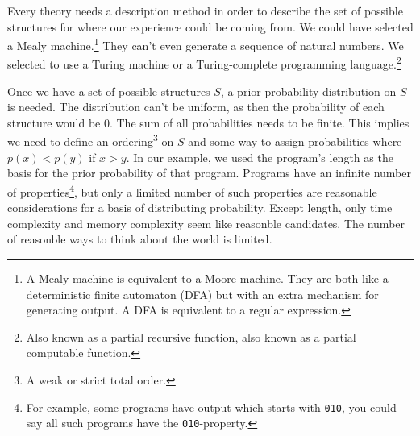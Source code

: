 Every theory needs a description method in order to describe the set of possible structures for where our experience could be coming from.
We could have selected a Mealy machine.\footnote{A Mealy machine is equivalent to a Moore machine. They are both like a deterministic finite automaton (DFA) but with an extra mechanism for generating output. A DFA is equivalent to a regular expression.}
They can't even generate a sequence of natural numbers.
We selected to use a Turing machine or a Turing-complete programming language.\footnote{Also known as a partial recursive function, also known as a partial computable function.}

Once we have a set of possible structures $S$, a prior probability distribution on $S$ is needed.
The distribution can't be uniform, as then the probability of each structure would be 0.
The sum of all probabilities needs to be finite.
This implies we need to define an ordering\footnote{A weak or strict total order.} on $S$ and some way to assign probabilities where $p(x) < p(y)$ if $x > y$.
In our example, we used the program's length as the basis for the prior probability of that program.
Programs have an infinite number of properties\footnote{For example, some programs have output which starts with \texttt{010}, you could say all such programs have the \texttt{010}-property.}, but only a limited number of such properties are reasonable considerations for a basis of distributing probability.
Except length, only time complexity and memory complexity seem like reasonble candidates.
The number of reasonble ways to think about the world is limited.

\newpage

